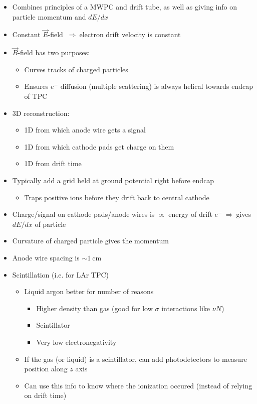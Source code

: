 \documentclass[11pt]{article}
\newcommand{\E}{\ensuremath{\vec{E}}}
\newcommand{\B}{\ensuremath{\vec{B}}}
\newcommand{\cm}{\text{cm}}
\newcommand{\el}{\ensuremath{e^{-}}\xspace}
\newcommand{\thus}{$~\Rightarrow~$}
\begin{document}
\begin{itemize}
  \item Combines principles of a MWPC and drift tube, as well as giving info on particle momentum and $dE/dx$
  \item Constant \E-field \thus electron drift velocity is constant
  \item \B-field has two purposes:
  \begin{itemize}
    \item Curves tracks of charged particles
    \item Ensures \el diffusion (multiple scattering) is always helical towards endcap of TPC
  \end{itemize}
  \item 3D reconstruction:
  \begin{itemize}
    \item 1D from which anode wire gets a signal
    \item 1D from which cathode pads get charge on them
    \item 1D from drift time
  \end{itemize}
  \item Typically add a grid held at ground potential right before endcap
  \begin{itemize}
    \item Traps positive ions before they drift back to central cathode
  \end{itemize}
  \item Charge/signal on cathode pads/anode wires is $\propto$ energy of drift \el \thus gives $dE/dx$ of particle
  \item Curvature of charged particle gives the momentum
  \item Anode wire spacing is $\sim1~\cm$
  \item Scintillation (i.e. for LAr TPC)
  \begin{itemize}
    \item Liquid argon better for number of reasons
    \begin{itemize}
      \item Higher density than gas (good for low $\sigma$ interactions like $\nu N$)
      \item Scintillator
      \item Very low electronegativity
    \end{itemize}
    \item If the gas (or liquid) is a scintillator, can add photodetectors to measure position along $z$ axis
    \item Can use this info to know where the ionization occured (instead of relying on drift time)
  \end{itemize}
\end{itemize}
\end{document}
